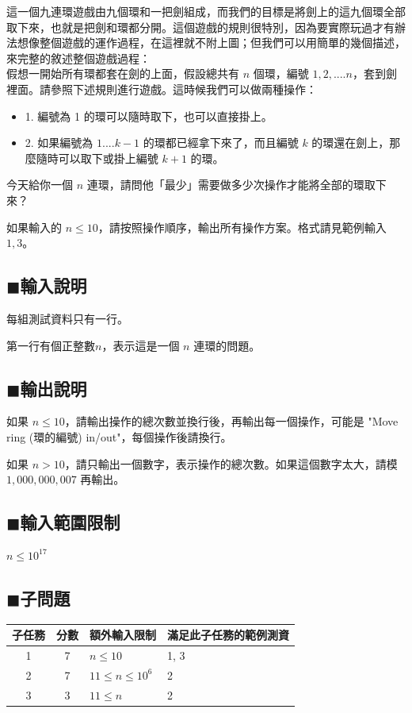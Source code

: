 \documentclass[12pt,a4paper]{article}
\begin{document}
這一個九連環遊戲由九個環和一把劍組成，而我們的目標是將劍上的這九個環全部取下來，也就是把劍和環都分開。這個遊戲的規則很特別，因為要實際玩過才有辦法想像整個遊戲的運作過程，在這裡就不附上圖；但我們可以用簡單的幾個描述，來完整的敘述整個遊戲過程：\\

假想一開始所有環都套在劍的上面，假設總共有 $n$ 個環，編號 $1, 2, .... n$，套到劍裡面。請參照下述規則進行遊戲。這時候我們可以做兩種操作：\\

\begin{itemize}
\item 1. 編號為 1 的環可以隨時取下，也可以直接掛上。
\item 2. 如果編號為 $1.... k-1$ 的環都已經拿下來了，而且編號 $k$ 的環還在劍上，那麼隨時可以取下或掛上編號 $k+1$ 的環。
\end{itemize}

今天給你一個 $n$ 連環，請問他「最少」需要做多少次操作才能將全部的環取下來？

如果輸入的 $n \leq 10$，請按照操作順序，輸出所有操作方案。格式請見範例輸入 $1, 3$。

\subsection*{$\blacksquare$輸入說明}
每組測試資料只有一行。\par
第一行有個正整數\(n\)，表示這是一個 $n$ 連環的問題。\par

\subsection*{$\blacksquare$輸出說明}
如果 $n \leq 10$，請輸出操作的總次數並換行後，再輸出每一個操作，可能是 "Move ring (環的編號) in/out"，每個操作後請換行。\par
如果 $n > 10$，請只輸出一個數字，表示操作的總次數。如果這個數字太大，請模 $1, 000, 000, 007$ 再輸出。

\subsection*{$\blacksquare$輸入範圍限制}
\(n \leq 10^{17} \) \par


\subsection*{$\blacksquare$子問題}
\begin{table}[h]
\centering
\begin{tabular}{ccll}
\toprule[1.5pt]
\textbf{子任務}&\textbf{分數}&\multicolumn{1}{c}{\textbf{額外輸入限制}}&\multicolumn{1}{c}{\textbf{滿足此子任務的範例測資}}\\
\midrule[1.5pt]
1&7& $n \leq 10 $ &1, 3\\
\midrule[0.75pt]
2&7& $ 11 \leq n \leq 10^6 $ &2\\
\midrule[0.75pt]
3&3& $ 11 \leq n $ &2\\
\bottomrule[1.5pt]
\end{tabular}
\end{table}
\end{document}
